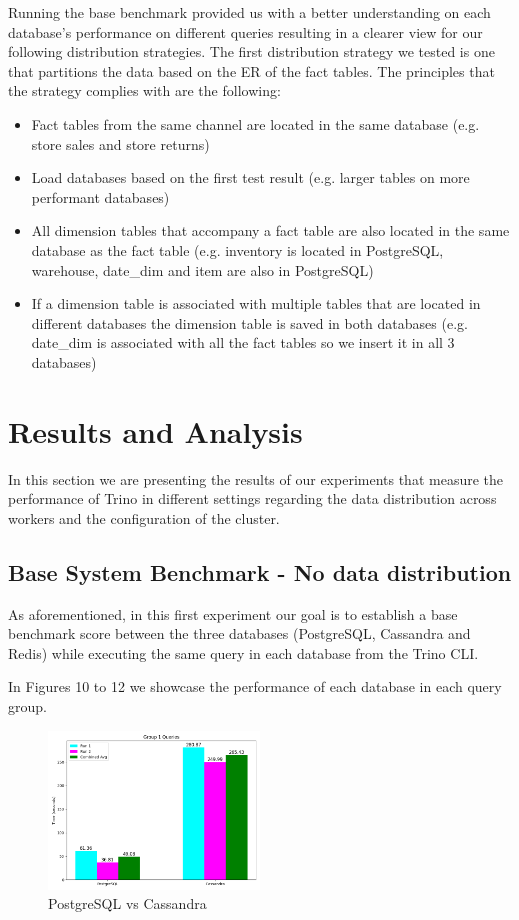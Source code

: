 \documentclass[conference]{IEEEtran}
\begin{document}
Running the base benchmark provided us with a better understanding on each database's performance on different queries resulting in a clearer view for our following distribution strategies. The first distribution strategy we tested is one that partitions the data based on the ER of the fact tables.
The principles that the strategy complies with are the following:
\begin{itemize}
	\item \textbf{} Fact tables from the same channel are located in the same database (e.g. store sales and store returns)
	\item \textbf{} Load databases based on the first test result (e.g. larger tables on more performant databases)
	\item \textbf{} All dimension tables that accompany a fact table are also located in the same database as the fact table (e.g. inventory is located in PostgreSQL, warehouse, date\_dim and item are also in PostgreSQL)
	\item \textbf{} If a dimension table is associated with multiple tables that are located in different databases the dimension table is saved in both databases (e.g. date\_dim is associated with all the fact tables so we insert it in all 3 databases)
\end{itemize}

\section{Results and Analysis}

In this section we are presenting the results of our experiments that measure the performance of Trino in different settings regarding the data distribution across workers and the configuration of the cluster.

\subsection{Base System Benchmark - No data distribution}
\label{sec:no-data-distribution}

As aforementioned, in this first experiment our goal is to establish a base benchmark score between the three databases (PostgreSQL, Cassandra and Redis) while executing the same query in each database from the Trino CLI.

In Figures 10 to 12 we showcase the performance of each database in each query group.

\begin{figure}[h]
	\centering
	\includegraphics[width=0.5\textwidth]{images/DBs_bench_no_distro/group1.png}
	\caption{PostgreSQL vs Cassandra}
	\label{fig:psql-cass-group1}
\end{figure}
\end{document}
